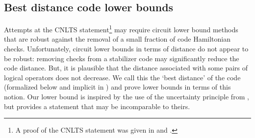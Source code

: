 \documentclass[11pt]{article}
\begin{document}
\subsection{Best distance code lower bounds}

Attempts at the CNLTS statement\footnote{A proof of the CNLTS statement was given in \cite{cnlts-proof} and \cite{nlts-proof}.} may require circuit lower bound methods that are
robust %
against %
the removal of a small fraction of code Hamiltonian checks. Unfortunately, circuit lower bounds in terms of distance do not appear to be robust: removing checks from a stabilizer code may significantly reduce the code distance. But, it is plausible that the distance associated with some pairs of logical operators does not decrease. We call this the `best distance' of the code (formalized below and implicit in \cite{8104078}) and prove lower bounds in terms of this notion. Our lower bound is inspired by the use of the uncertainty principle from \cite{8104078}, but provides a statement that may be incomparable to theirs.
\end{document}
